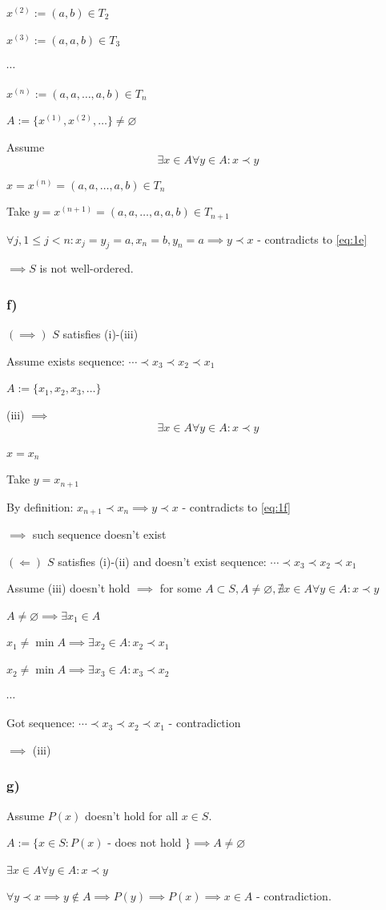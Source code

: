 \documentclass{article}
\begin{document}
$x^{(2)} := (a, b) \in T_2$

$x^{(3)} := (a, a, b) \in T_3$

$\cdots$

$x^{(n)} := (a,a,\ldots,a,b) \in T_n$

$A := \{ x^{(1)}, x^{(2)}, \ldots \} \neq \varnothing$

Assume \[\exists x \in A \forall y \in A: x \prec y \tag{1}\label{eq:1e}\]

$x = x^{(n)} = (a,a,\ldots,a,b) \in T_n$

Take $y = x^{(n+1)} = (a,a,\ldots,a,a,b) \in T_{n+1}$

$\forall j, 1 \leq j < n: x_j = y_j = a, x_n = b, y_n = a \implies y \prec x$ - contradicts to \eqref{eq:1e}

$\implies S$ is not well-ordered.

\subsubsection*{f)}

$(\implies)$ $S$ satisfies (i)-(iii)

Assume exists sequence: $\cdots \prec x_3 \prec x_2 \prec x_1$

$A := \{ x_1, x_2, x_3, \ldots \}$

(iii) $\implies$
\[\exists x \in A \forall y \in A: x \prec y \tag{1}\label{eq:1f}\]

$x = x_n$

Take $y = x_{n+1}$

By definition: $x_{n+1} \prec x_n \implies y \prec x$ - contradicts to \eqref{eq:1f}

$\implies$ such sequence doesn't exist

$(\Longleftarrow)$ $S$ satisfies (i)-(ii) and doesn't exist sequence: $\cdots \prec x_3 \prec x_2 \prec x_1$

Assume (iii) doesn't hold $\implies$ for some $A \subset S, A \neq \varnothing, \nexists x \in A \forall y \in A: x \prec y$

$A \neq \varnothing \implies \exists x_1 \in A$

$x_1 \neq \min A \implies \exists x_2 \in A: x_2 \prec x_1$

$x_2 \neq \min A \implies \exists x_3 \in A: x_3 \prec x_2$

$\cdots$

Got sequence: $\cdots \prec x_3 \prec x_2 \prec x_1$ - contradiction

$\implies$ (iii)

\subsubsection*{g)}

Assume $P(x)$ doesn't hold for all $x \in S$.

$A := \{ x \in S: P(x)$ - does not hold $\} \implies A \neq \varnothing$

$\exists x \in A \forall y \in A: x \prec y$

$\forall y \prec x \implies y \notin A \implies P(y) \implies P(x) \implies x \in A$ - contradiction.
\end{document}
